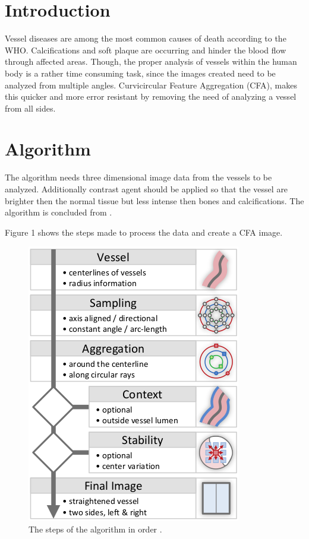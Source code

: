 \section{Introduction}
Vessel diseases are among the most common causes of death according to the WHO. Calcifications and soft plaque are occurring and hinder the blood flow through affected areas. \cite{WHO2017} Though, the proper analysis of vessels within the human body is a rather time consuming task, since the images created need to be analyzed from multiple angles. Curvicircular Feature Aggregation (CFA), makes this quicker and more error resistant by removing the need of analyzing a vessel from all sides.

\section{Algorithm}
The algorithm needs three dimensional image data from the vessels to be analyzed. Additionally contrast agent should be applied so that the vessel are brighter then the normal tissue but less intense then bones and calcifications. The algorithm is concluded from \cite{Mistelbauer2013}.

Figure 1 shows the steps made to process the data and create a CFA image.

\begin{figure} \label{img_workflow}
	\includegraphics[width=\columnwidth]{img/cfaworkflow}
	\caption{The steps of the algorithm in order \cite{Mistelbauer2013}.}
\end{figure}

